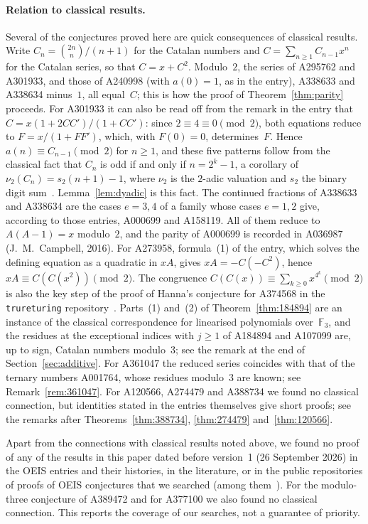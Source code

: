 \documentclass[11pt]{article}
\theoremstyle{remark}
\newcommand{\F}{\mathbb F}
\newcommand{\dsarxiv}{arXiv:\allowbreak math/\allowbreak0407326v1}
\begin{document}
\paragraph{Relation to classical results.} Several of the conjectures proved
here are quick consequences of classical results. Write
$C_n=\binom{2n}{n}/(n+1)$ for the Catalan numbers and
$C=\sum_{n\ge1}C_{n-1}x^n$ for the Catalan series, so that $C=x+C^2$.
Modulo~$2$, the series of A295762 and A301933, and those of A240998 (with
$a(0)=1$, as in the entry), A338633 and A338634 minus~$1$, all equal~$C$; this is how the proof of
Theorem~\ref{thm:parity} proceeds. For A301933 it can also be read off from
the remark in the entry that $C=x(1+2CC')/(1+CC')$: since
$2\equiv4\equiv0\pmod2$, both equations reduce to $F=x/(1+FF')$, which, with
$F(0)=0$, determines~$F$. Hence $a(n)\equiv C_{n-1}\pmod2$ for $n\ge1$, and these five
patterns follow from the classical fact that $C_n$ is odd if and only if
$n=2^k-1$, a corollary of $\nu_2(C_n)=s_2(n+1)-1$, where $\nu_2$ is the
$2$-adic valuation and $s_2$ the binary digit
sum~\cite[Theorem~2.1 in \dsarxiv]{ds}. Lemma~\ref{lem:dyadic} is this fact.
The continued fractions of A338633 and A338634 are the cases $e=3,4$ of a
family whose cases $e=1,2$ give, according to those entries, A000699 and
A158119. All of them reduce to
$A(A-1)=x$ modulo~$2$, and the parity of A000699 is recorded in A036987
(J.~M.~Campbell, 2016). For A273958, formula~(1) of the entry, which solves
the defining equation as a quadratic in $xA$, gives $xA=-C(-C^2)$, hence
$xA\equiv C(C(x^2))\pmod2$. The congruence
$C(C(x))\equiv\sum_{k\ge0}x^{4^k}\pmod2$ is also the key step of the proof of
Hanna's conjecture for A374568 in the \texttt{trureturing}
repository~\cite{tru374568}. Parts~(1) and~(2) of Theorem~\ref{thm:184894}
are an instance of the classical correspondence for linearised polynomials
over~$\F_3$, and the residues at the exceptional indices with $j\ge1$ of
A184894 and A107099 are, up to sign, Catalan numbers modulo~$3$; see the remark at the
end of Section~\ref{sec:additive}. For A361047 the reduced series coincides with that of the
ternary numbers A001764, whose residues modulo~$3$ are known; see
Remark~\ref{rem:361047}. For A120566, A274479 and A388734 we found no
classical connection, but identities stated in the entries themselves give
short proofs; see the remarks after Theorems~\ref{thm:388734},
\ref{thm:274479} and~\ref{thm:120566}.

Apart from the connections with classical results noted above, we found no
proof of any of the results in this paper dated before version~1 (26 September
2026) in the OEIS entries and their histories, in the literature, or in the
public repositories of proofs of OEIS conjectures that we searched (among
them~\cite{pfrepo,trurepo}). For the modulo-three conjecture of A389472 and for
A377100 we also found no classical connection. This reports the coverage of our
searches, not a guarantee of priority.
\end{document}
